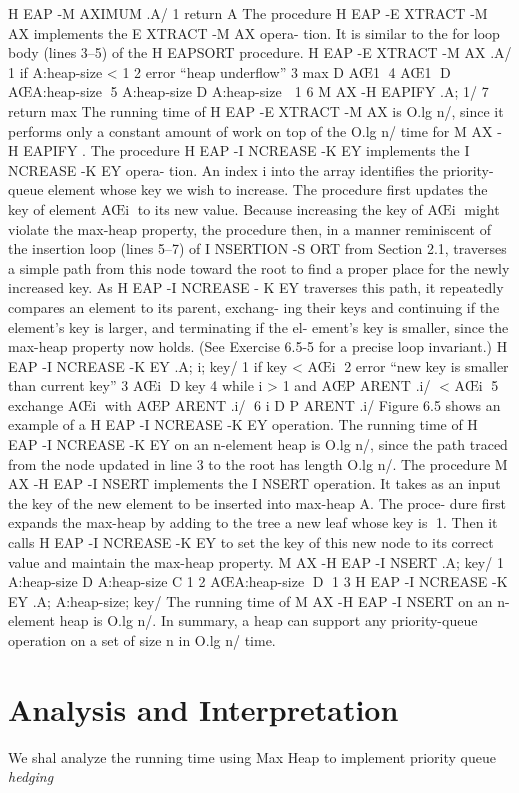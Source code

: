 \documentclass{article}
\begin{document}
H EAP -M AXIMUM .A/
1 return A
The procedure H EAP -E XTRACT -M AX implements the E XTRACT -M AX opera-
tion. It is similar to the for loop body (lines 3–5) of the H EAPSORT procedure.
H EAP -E XTRACT -M AX .A/
1 if A:heap-size < 1
2
error “heap underflow”
3 max D AŒ1
4 AŒ1 D AŒA:heap-size
5 A:heap-size D A:heap-size  1
6 M AX -H EAPIFY .A; 1/
7 return max
The running time of H EAP -E XTRACT -M AX is O.lg n/, since it performs only a
constant amount of work on top of the O.lg n/ time for M AX -H EAPIFY .
The procedure H EAP -I NCREASE -K EY implements the I NCREASE -K EY opera-
tion. An index i into the array identifies the priority-queue element whose key we
wish to increase. The procedure first updates the key of element AŒi to its new
value. Because increasing the key of AŒi might violate the max-heap property,
the procedure then, in a manner reminiscent of the insertion loop (lines 5–7) of
I NSERTION -S ORT from Section 2.1, traverses a simple path from this node toward
the root to find a proper place for the newly increased key. As H EAP -I NCREASE -
K EY traverses this path, it repeatedly compares an element to its parent, exchang-
ing their keys and continuing if the element’s key is larger, and terminating if the el-
ement’s key is smaller, since the max-heap property now holds. (See Exercise 6.5-5
for a precise loop invariant.)
H EAP -I NCREASE -K EY .A; i; key/
1 if key < AŒi
2
error “new key is smaller than current key”
3 AŒi D key
4 while i > 1 and AŒP ARENT .i/ < AŒi
5
exchange AŒi with AŒP ARENT .i/
6
i D P ARENT .i/
Figure 6.5 shows an example of a H EAP -I NCREASE -K EY operation. The running
time of H EAP -I NCREASE -K EY on an n-element heap is O.lg n/, since the path
traced from the node updated in line 3 to the root has length O.lg n/.
The procedure M AX -H EAP -I NSERT implements the I NSERT operation. It takes
as an input the key of the new element to be inserted into max-heap A. The proce-
dure first expands the max-heap by adding to the tree a new leaf whose key is 1.
Then it calls H EAP -I NCREASE -K EY to set the key of this new node to its correct
value and maintain the max-heap property.
M AX -H EAP -I NSERT .A; key/
1 A:heap-size D A:heap-size C 1
2 AŒA:heap-size D 1
3 H EAP -I NCREASE -K EY .A; A:heap-size; key/
The running time of M AX -H EAP -I NSERT on an n-element heap is O.lg n/.
In summary, a heap can support any priority-queue operation on a set of size n
in O.lg n/ time.


\section{Analysis and Interpretation}
We shal analyze the running time using Max Heap to implement priority queue {\em hedging}
\end{document}
